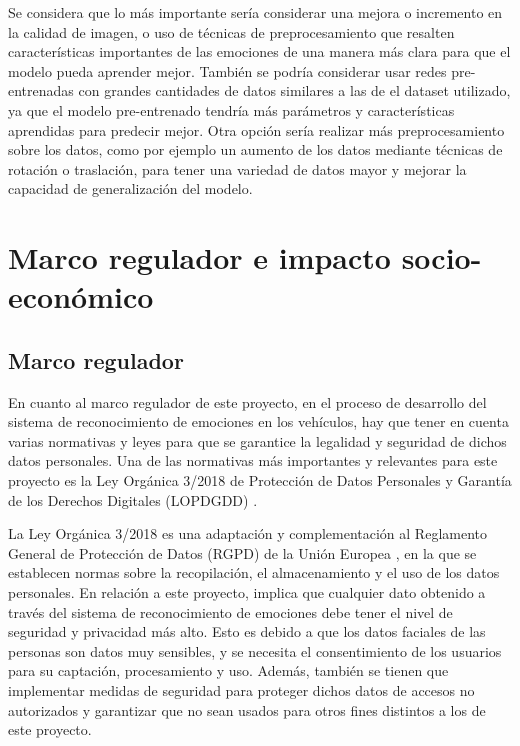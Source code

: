 \documentclass[12pt]{report} %
\begin{document}
Se considera que lo más importante sería considerar una mejora o incremento en la calidad de imagen, o uso de técnicas de preprocesamiento que resalten características importantes de las emociones de una manera más clara para que el modelo pueda aprender mejor. También se podría considerar usar redes pre-entrenadas con grandes cantidades de datos similares a las de el dataset utilizado, ya que el modelo pre-entrenado tendría más parámetros y características aprendidas para predecir mejor. Otra opción sería realizar más preprocesamiento sobre los datos, como por ejemplo un aumento de los datos mediante técnicas de rotación o traslación, para tener una variedad de datos mayor y mejorar la capacidad de generalización del modelo. 



\chapter{Marco regulador e impacto socio-económico}

\section{Marco regulador}

En cuanto al marco regulador de este proyecto, en el proceso de desarrollo del sistema de reconocimiento de emociones en los vehículos, hay que tener en cuenta varias normativas y leyes para que se garantice la legalidad y seguridad de dichos datos personales. Una de las normativas más importantes y relevantes para este proyecto es la Ley Orgánica 3/2018 de Protección de Datos Personales y Garantía de los Derechos Digitales (LOPDGDD) 
\cite{lopd-gdd}.

La Ley Orgánica 3/2018 es una adaptación y complementación al Reglamento General de Protección de Datos (RGPD) de la Unión Europea \cite{rgpd}, en la que se establecen normas sobre la recopilación, el almacenamiento y el uso de los datos personales. En relación a este proyecto, implica que cualquier dato obtenido a través del sistema de reconocimiento de emociones debe tener el nivel de seguridad y privacidad más alto. Esto es debido a que los datos faciales de las personas son datos muy sensibles, y se necesita el consentimiento de los usuarios para su captación, procesamiento y uso. Además, también se tienen que implementar medidas de seguridad para proteger dichos datos de accesos no autorizados y garantizar que no sean usados para otros fines distintos a los de este proyecto. 
\end{document}
